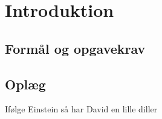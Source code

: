 \section{Introduktion}
    \subsection{Formål og opgavekrav}
        
    \subsection{Oplæg}
        Ifølge Einstein så har David en lille diller\cite{einstein}